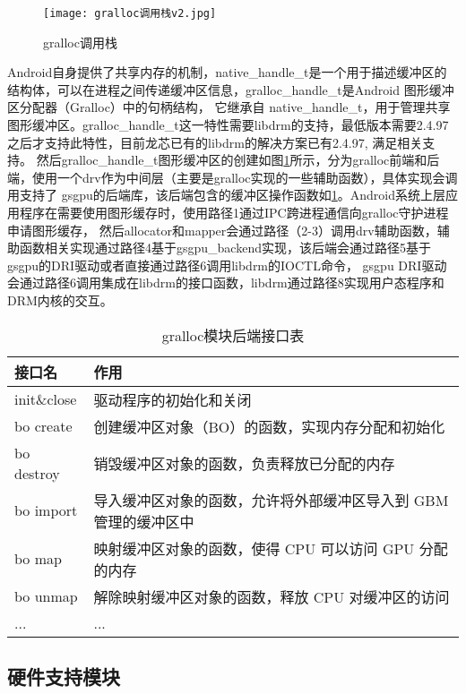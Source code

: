 \begin{figure}[h]
  \centering
  \texttt{[image: gralloc调用栈v2.jpg]}
  \caption{gralloc调用栈}
  \label{fig:gralloc调用栈}
\end{figure}

Android自身提供了共享内存的机制，native\_handle\_t是一个用于描述缓冲区的结构体，可以在进程之间传递缓冲区信息，gralloc\_handle\_t是Android 图形缓冲区分配器（Gralloc）中的句柄结构，
它继承自 native\_handle\_t，用于管理共享图形缓冲区。gralloc\_handle\_t这一特性需要libdrm的支持，最低版本需要2.4.97之后才支持此特性，目前龙芯已有的libdrm的解决方案已有2.4.97,
满足相关支持。
然后gralloc\_handle\_t图形缓冲区的创建如图\ref{fig:gralloc调用栈}所示，分为gralloc前端和后端，使用一个drv作为中间层（主要是gralloc实现的一些辅助函数），具体实现会调用支持了
gsgpu的后端库，该后端包含的缓冲区操作函数如\ref{tab:gralloc模块后端接口表}。Android系统上层应用程序在需要使用图形缓存时，使用路径1通过IPC跨进程通信向gralloc守护进程申请图形缓存，
然后allocator和mapper会通过路径（2-3）调用drv辅助函数，辅助函数相关实现通过路径4基于gsgpu\_backend实现，该后端会通过路径5基于gsgpu的DRI驱动或者直接通过路径6调用libdrm的IOCTL命令，
gsgpu DRI驱动会通过路径6调用集成在libdrm的接口函数，libdrm通过路径8实现用户态程序和DRM内核的交互。

\begin{table}[h]  
  \centering
  \caption{gralloc模块后端接口表}
  \label{tab:gralloc模块后端接口表}
  \begin{tabular}{ll}
    \toprule
    接口名  & 作用\\
    \midrule
    init\&close & 驱动程序的初始化和关闭 \\
    bo create & 创建缓冲区对象（BO）的函数，实现内存分配和初始化 \\
    bo destroy & 销毁缓冲区对象的函数，负责释放已分配的内存 \\
    bo import & 导入缓冲区对象的函数，允许将外部缓冲区导入到 GBM 管理的缓冲区中 \\
    bo map & 映射缓冲区对象的函数，使得 CPU 可以访问 GPU 分配的内存 \\
    bo unmap & 解除映射缓冲区对象的函数，释放 CPU 对缓冲区的访问 \\
    ... & ... \\
    \bottomrule
  \end{tabular}
  \note{}
\end{table}

\subsection{硬件支持模块}

